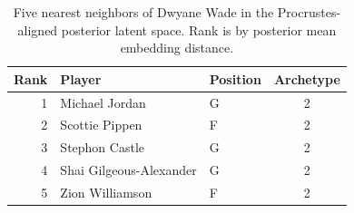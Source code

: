 \begin{table}[htbp]
  \centering\small
  \begin{tabular}{rllc}
    \toprule
    Rank & Player & Position & Archetype \\
    \midrule
    1 & Michael Jordan & G & 2 \\
    2 & Scottie Pippen & F & 2 \\
    3 & Stephon Castle & G & 2 \\
    4 & Shai Gilgeous-Alexander & G & 2 \\
    5 & Zion Williamson & F & 2 \\
    \bottomrule
  \end{tabular}
  \caption{Five nearest neighbors of Dwyane Wade in the Procrustes-aligned posterior latent space. Rank is by posterior mean embedding distance.}
  \label{tab:Dwyane_Wade_neighbors}
\end{table}

